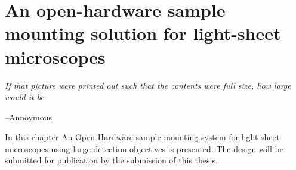 \ifpdf
    \graphicspath{{Chapters/chamber/Figs/Raster/}{Chapters/chamber/Figs/PDF/}{Chapters/chamber/Figs/}}
\else
    \graphicspath{{Chapters/chamber/Figs/Vector/}{Chapters/chamber/Figs/}}
\fi


\chapter{An open-hardware sample mounting solution for light-sheet microscopes}\label{chapter:chamber}
\epigraph{\emph{If that picture were printed out such that the contents were full size, how large would it be}}{--Annoymous}
 In this chapter An Open-Hardware sample mounting system for light-sheet microscopes using large detection objectives is presented.
 The design will be submitted for publication by the submission of this thesis.

 \pagebreak
 

